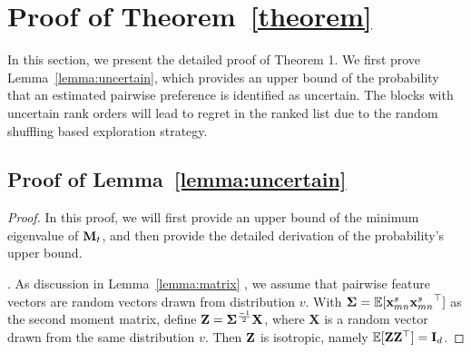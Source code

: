 \section{Proof of Theorem~\ref{theorem}}
In this section, we present the detailed proof of Theorem 1. We first prove Lemma~\ref{lemma:uncertain}, which provides an upper bound of the probability that an estimated pairwise preference is identified as uncertain. The blocks with uncertain rank orders will lead to regret in the ranked list due to the random shuffling based exploration strategy.


\subsection{Proof of Lemma~\ref{lemma:uncertain}}

\begin{proof}

In this proof, we will first provide an upper bound of the minimum eigenvalue of $\mathbf{M}_t$, and then provide the detailed derivation of the probability's upper bound.

.
As discussion in Lemma~\ref{lemma:matrix} , we assume that pairwise feature vectors are random vectors drawn from  distribution $v$. With $\mathbf{\Sigma} = \mathbb{E}[{\mathbf{x}_{mn}^s}{\mathbf{x}_{mn}^s}^\top]$ as the second moment matrix, define $\mathbf{Z} = \mathbf{\Sigma}^\frac{-1}{2}\mathbf{X}$, where $\mathbf{X}$ is a random vector drawn from the same distribution $v$. Then $\mathbf{Z}$ is isotropic, namely $\mathbb{E}[\mathbf{Z}\mathbf{Z}^\top] = \mathbf{I}_d$. 


\end{proof}
